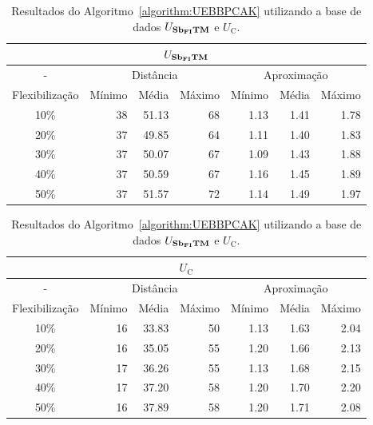 \begin{table}[!htb]
  \caption{Resultados do Algoritmo~\ref{algorithm:UEBBPCAK} utilizando a base de dados $U_{\textbf{Sb\textsubscript{FI}TM}}{}$ e $U_{\text{C}}$.}
  \label{table:OAYXLAOR}
  \centering
  \begin{tabular}{|c|r|r|r|r|r|r|}
    \hline
    \multicolumn{7}{|c|}{$U_{\textbf{Sb\textsubscript{FI}TM}}{}$}                                                                      \\ \hline
      -            & \multicolumn{3}{c|}{Distância}             & \multicolumn{3}{c|}{Aproximação}           \\ \hline
    Flexibilização & Mínimo       & Média        & Máximo       & Mínimo       & Média        & Máximo       \\ \hline  
    10\%           & 38           & 51.13        & 68           & 1.13         & 1.41         & 1.78         \\ \hline
    20\%           & 37           & 49.85        & 64           & 1.11         & 1.40         & 1.83         \\ \hline
    30\%           & 37           & 50.07        & 67           & 1.09         & 1.43         & 1.88         \\ \hline
    40\%           & 37           & 50.59        & 67           & 1.16         & 1.45         & 1.89         \\ \hline
    50\%           & 37           & 51.57        & 72           & 1.14         & 1.49         & 1.97         \\ \hline    
  \end{tabular}

  \vspace{5mm}

  \begin{tabular}{|c|r|r|r|r|r|r|}
    \hline
    \multicolumn{7}{|c|}{$U_{\text{C}}$}                                                                     \\ \hline
      -            & \multicolumn{3}{c|}{Distância}             & \multicolumn{3}{c|}{Aproximação}           \\ \hline
    Flexibilização & Mínimo       & Média        & Máximo       & Mínimo       & Média        & Máximo       \\ \hline  
    10\%           & 16           & 33.83        & 50           & 1.13         & 1.63         & 2.04         \\ \hline
    20\%           & 16           & 35.05        & 55           & 1.20         & 1.66         & 2.13         \\ \hline
    30\%           & 17           & 36.26        & 55           & 1.13         & 1.68         & 2.15         \\ \hline
    40\%           & 17           & 37.20        & 58           & 1.20         & 1.70         & 2.20         \\ \hline
    50\%           & 16           & 37.89        & 58           & 1.20         & 1.71         & 2.08         \\ \hline    
  \end{tabular}
\end{table}

